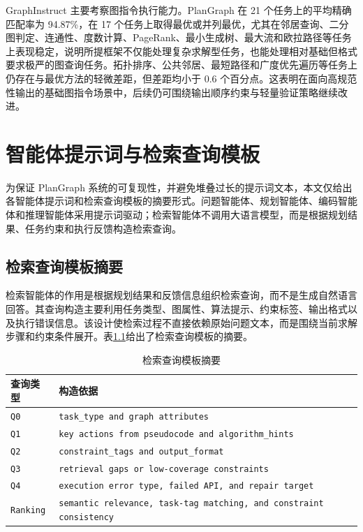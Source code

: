 GraphInstruct 主要考察图指令执行能力。PlanGraph 在 21 个任务上的平均精确匹配率为 94.87\%，在 17 个任务上取得最优或并列最优，尤其在邻居查询、二分图判定、连通性、度数计算、PageRank、最小生成树、最大流和欧拉路径等任务上表现稳定，说明所提框架不仅能处理复杂求解型任务，也能处理相对基础但格式要求极严的图查询任务。拓扑排序、公共邻居、最短路径和广度优先遍历等任务上仍存在与最优方法的轻微差距，但差距均小于 0.6 个百分点。这表明在面向高规范性输出的基础图指令场景中，后续仍可围绕输出顺序约束与轻量验证策略继续改进。


\chapter{智能体提示词与检索查询模板}
\label{appendix:prompt_templates}

为保证 PlanGraph 系统的可复现性，并避免堆叠过长的提示词文本，本文仅给出各智能体提示词和检索查询模板的摘要形式。问题智能体、规划智能体、编码智能体和推理智能体采用提示词驱动；检索智能体不调用大语言模型，而是根据规划结果、任务约束和执行反馈构造检索查询。

\section{检索查询模板摘要}

检索智能体的作用是根据规划结果和反馈信息组织检索查询，而不是生成自然语言回答。其查询构造主要利用任务类型、图属性、算法提示、约束标签、输出格式以及执行错误信息。该设计使检索过程不直接依赖原始问题文本，而是围绕当前求解步骤和约束条件展开。表\ref{tab:appendix_retrieval_query_template}给出了检索查询模板的摘要。

\begin{table}[H]
\centering
\small
\caption{检索查询模板摘要}
\label{tab:appendix_retrieval_query_template}
\begin{tabular}{p{2.0cm}p{10.5cm}}
\toprule
查询类型 & 构造依据 \\
\midrule
\texttt{Q0} & \texttt{task\_type and graph attributes} \\
\texttt{Q1} & \texttt{key actions from pseudocode and algorithm\_hints} \\
\texttt{Q2} & \texttt{constraint\_tags and output\_format} \\
\texttt{Q3} & \texttt{retrieval gaps or low-coverage constraints} \\
\texttt{Q4} & \texttt{execution error type, failed API, and repair target} \\
\texttt{Ranking} & \texttt{semantic relevance, task-tag matching, and constraint consistency} \\
\bottomrule
\end{tabular}
\end{table}

